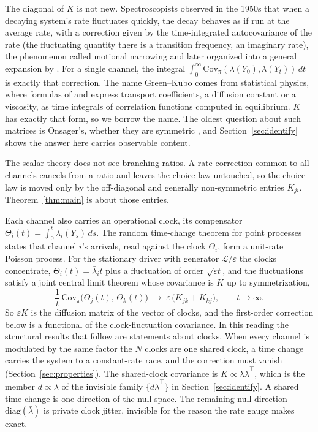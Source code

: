\documentclass[11pt]{article}
\theoremstyle{remark}
\newcommand{\lbar}{\bar{\lambda}}
\begin{document}
The diagonal of $K$ is not new. Spectroscopists observed in the 1950s that
when a decaying system's rate fluctuates quickly, the decay behaves as if run
at the average rate, with a correction given by the time-integrated
autocovariance of the rate (the fluctuating quantity there is a transition
frequency, an imaginary rate), the phenomenon called motional narrowing
\citep{anderson1954,kubo1954} and later organized into a general expansion by
\citet{vankampen1974}. For a single channel, the integral
$\int_0^\infty \mathrm{Cov}_\pi(\lambda(Y_0), \lambda(Y_t))\,dt$ is
exactly that correction. The name Green--Kubo comes from statistical physics, where formulas of
\citet{green1954} and \citet{kubo1957} express transport coefficients, a
diffusion constant or a viscosity, as time integrals of correlation functions
computed in equilibrium. $K$ has exactly that form, so we borrow the name.
The oldest question about such matrices is Onsager's, whether they are
symmetric \citep{onsager1931}, and Section~\ref{sec:identify} shows the
answer here carries observable content.

The scalar theory does not see branching ratios. A rate correction common to
all channels cancels from a ratio and leaves the choice law untouched, so the
choice law is moved only by the off-diagonal and generally non-symmetric
entries $K_{ji}$. Theorem~\ref{thm:main} is about those entries.

Each channel also carries an operational clock, its compensator
$\Theta_i(t) = \int_0^t \lambda_i(Y_s)\,ds$. The random time-change theorem
for point processes \citep{meyer1971,papangelou1972} states that channel
$i$'s arrivals, read against the clock $\Theta_i$, form a unit-rate Poisson
process. For the stationary driver with generator $\mathcal{L}/\varepsilon$
the clocks concentrate, $\Theta_i(t) = \lbar_i t$ plus a fluctuation of order
$\sqrt{\varepsilon t}$, and the fluctuations satisfy a joint central limit
theorem whose covariance is $K$ up to symmetrization,
\[
  \frac{1}{t}\,\mathrm{Cov}_\pi\!\big(\Theta_j(t),\,\Theta_k(t)\big)
  \;\longrightarrow\; \varepsilon\,\big(K_{jk} + K_{kj}\big),
  \qquad t \to \infty.
\]
So $\varepsilon K$ is the diffusion matrix of the vector of clocks, and the
first-order correction below is a functional of the clock-fluctuation
covariance. In this reading the structural results that follow are statements
about clocks. When every channel is modulated by the same factor the $N$
clocks are one shared clock, a time change carries the system to a
constant-rate race, and the correction must vanish
(Section~\ref{sec:properties}). The shared-clock covariance is
$K \propto \lbar\lbar^{\top}$, which is the member $d \propto \lbar$ of the
invisible family $\{d\lbar^{\top}\}$ in
Section~\ref{sec:identify}. A shared time change is one direction of the
null space. The remaining null direction $\mathrm{diag}(\lbar)$ is private
clock jitter, invisible for the reason the rate gauge makes exact.
\end{document}
